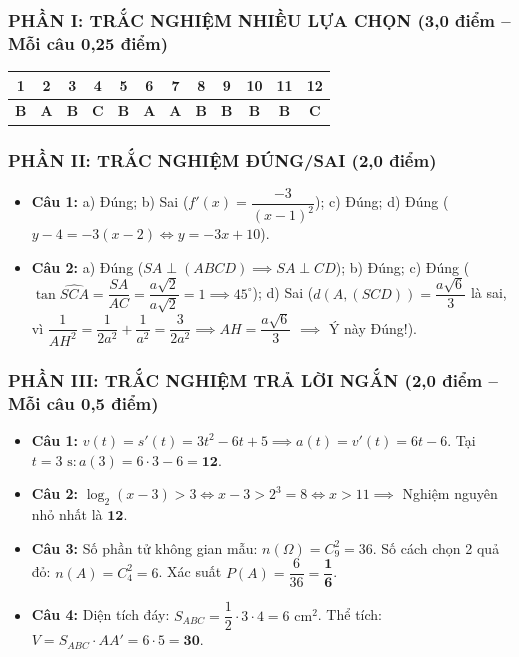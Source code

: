 \documentclass[12pt, a4paper]{article}
\begin{document}
\subsubsection*{PHẦN I: TRẮC NGHIỆM NHIỀU LỰA CHỌN (3,0 điểm -- Mỗi câu 0,25 điểm)}
\begin{center}
\begin{tabular}{|c|c|c|c|c|c|c|c|c|c|c|c|}
\hline
\textbf{1} & \textbf{2} & \textbf{3} & \textbf{4} & \textbf{5} & \textbf{6} & \textbf{7} & \textbf{8} & \textbf{9} & \textbf{10} & \textbf{11} & \textbf{12} \\
\hline
\textbf{B} & \textbf{A} & \textbf{B} & \textbf{C} & \textbf{B} & \textbf{A} & \textbf{A} & \textbf{B} & \textbf{B} & \textbf{B} & \textbf{B} & \textbf{C} \\
\hline
\end{tabular}
\end{center}

\subsubsection*{PHẦN II: TRẮC NGHIỆM ĐÚNG/SAI (2,0 điểm)}
\begin{itemize}
    \item \textbf{Câu 1:} a) Đúng; \quad b) Sai ($f'(x) = \dfrac{-3}{(x-1)^2}$); \quad c) Đúng; \quad d) Đúng ($y - 4 = -3(x - 2) \iff y = -3x + 10$).
    \item \textbf{Câu 2:} a) Đúng ($SA \perp (ABCD) \implies SA \perp CD$); \quad b) Đúng; \quad c) Đúng ($\tan\widehat{SCA} = \dfrac{SA}{AC} = \dfrac{a\sqrt{2}}{a\sqrt{2}} = 1 \implies 45^\circ$); \quad d) Sai ($d(A, (SCD)) = \dfrac{a\sqrt{6}}{3}$ là sai, vì $\dfrac{1}{AH^2} = \dfrac{1}{2a^2} + \dfrac{1}{a^2} = \dfrac{3}{2a^2} \implies AH = \dfrac{a\sqrt{6}}{3}$ $\implies$ Ý này Đúng!).
\end{itemize}

\subsubsection*{PHẦN III: TRẮC NGHIỆM TRẢ LỜI NGẮN (2,0 điểm -- Mỗi câu 0,5 điểm)}
\begin{itemize}
    \item \textbf{Câu 1:} $v(t) = s'(t) = 3t^2 - 6t + 5 \implies a(t) = v'(t) = 6t - 6$. Tại $t = 3\text{ s}: a(3) = 6 \cdot 3 - 6 = \mathbf{12}$.
    \item \textbf{Câu 2:} $\log_2(x - 3) > 3 \iff x - 3 > 2^3 = 8 \iff x > 11 \implies$ Nghiệm nguyên nhỏ nhất là $\mathbf{12}$.
    \item \textbf{Câu 3:} Số phần tử không gian mẫu: $n(\Omega) = C_9^2 = 36$. Số cách chọn 2 quả đỏ: $n(A) = C_4^2 = 6$. Xác suất $P(A) = \dfrac{6}{36} = \mathbf{\dfrac{1}{6}}$.
    \item \textbf{Câu 4:} Diện tích đáy: $S_{ABC} = \dfrac{1}{2} \cdot 3 \cdot 4 = 6\text{ cm}^2$. Thể tích: $V = S_{ABC} \cdot AA' = 6 \cdot 5 = \mathbf{30}$.
\end{itemize}
\end{document}
